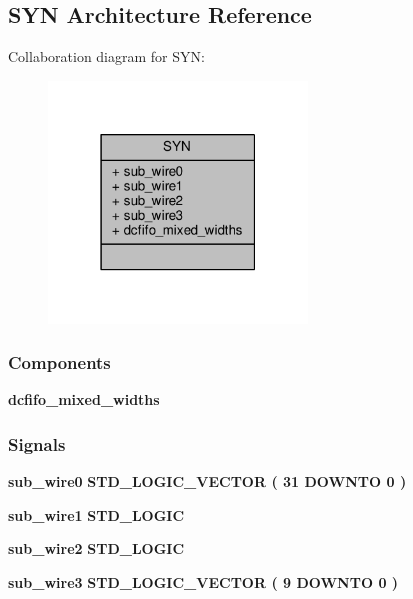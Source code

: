 \subsection{S\+YN Architecture Reference}
\label{classdecomp__fifo_1_1SYN}


Collaboration diagram for S\+YN\+:\nopagebreak
\begin{figure}[H]
\begin{center}
\leavevmode
\includegraphics[width=195pt]{d2/d14/classdecomp__fifo_1_1SYN__coll__graph}
\end{center}
\end{figure}
\subsubsection*{Components}
 \begin{DoxyCompactItemize}
\item 
{\bf dcfifo\+\_\+mixed\+\_\+widths}  {\bfseries }  
\end{DoxyCompactItemize}
\subsubsection*{Signals}
 \begin{DoxyCompactItemize}
\item 
{\bf sub\+\_\+wire0} {\bfseries \textcolor{comment}{S\+T\+D\+\_\+\+L\+O\+G\+I\+C\+\_\+\+V\+E\+C\+T\+OR}\textcolor{vhdlchar}{ }\textcolor{vhdlchar}{(}\textcolor{vhdlchar}{ }\textcolor{vhdlchar}{ } \textcolor{vhdldigit}{31} \textcolor{vhdlchar}{ }\textcolor{keywordflow}{D\+O\+W\+N\+TO}\textcolor{vhdlchar}{ }\textcolor{vhdlchar}{ } \textcolor{vhdldigit}{0} \textcolor{vhdlchar}{ }\textcolor{vhdlchar}{)}\textcolor{vhdlchar}{ }} 
\item 
{\bf sub\+\_\+wire1} {\bfseries \textcolor{comment}{S\+T\+D\+\_\+\+L\+O\+G\+IC}\textcolor{vhdlchar}{ }} 
\item 
{\bf sub\+\_\+wire2} {\bfseries \textcolor{comment}{S\+T\+D\+\_\+\+L\+O\+G\+IC}\textcolor{vhdlchar}{ }} 
\item 
{\bf sub\+\_\+wire3} {\bfseries \textcolor{comment}{S\+T\+D\+\_\+\+L\+O\+G\+I\+C\+\_\+\+V\+E\+C\+T\+OR}\textcolor{vhdlchar}{ }\textcolor{vhdlchar}{(}\textcolor{vhdlchar}{ }\textcolor{vhdlchar}{ } \textcolor{vhdldigit}{9} \textcolor{vhdlchar}{ }\textcolor{keywordflow}{D\+O\+W\+N\+TO}\textcolor{vhdlchar}{ }\textcolor{vhdlchar}{ } \textcolor{vhdldigit}{0} \textcolor{vhdlchar}{ }\textcolor{vhdlchar}{)}\textcolor{vhdlchar}{ }} 
\end{DoxyCompactItemize}
